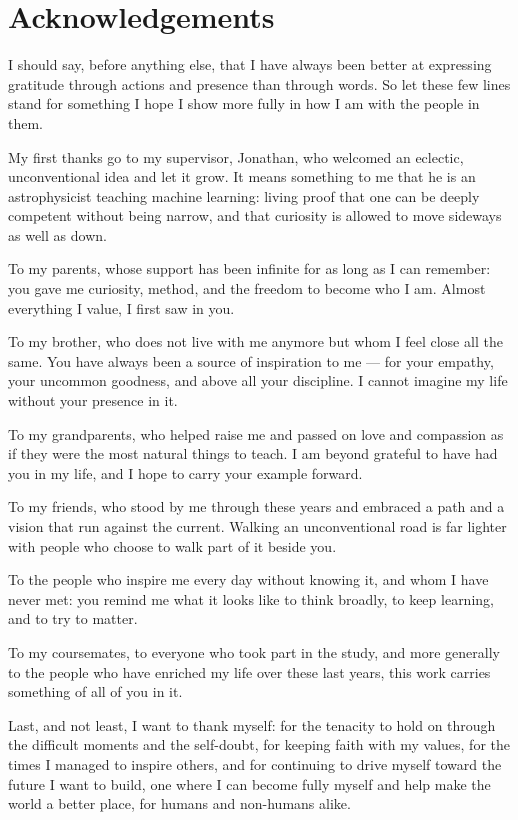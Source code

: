\chapter*{Acknowledgements}

I should say, before anything else, that I have always been better at expressing gratitude through actions and presence than through words. So let these few lines stand for something I hope I show more fully in how I am with the people in them.

My first thanks go to my supervisor, Jonathan, who welcomed an eclectic, unconventional idea and let it grow. It means something to me that he is an astrophysicist teaching machine learning: living proof that one can be deeply competent without being narrow, and that curiosity is allowed to move sideways as well as down.

To my parents, whose support has been infinite for as long as I can remember: you gave me curiosity, method, and the freedom to become who I am. Almost everything I value, I first saw in you.

To my brother, who does not live with me anymore but whom I feel close all the same. You have always been a source of inspiration to me — for your empathy, your uncommon goodness, and above all your discipline. I cannot imagine my life without your presence in it.

To my grandparents, who helped raise me and passed on love and compassion as if they were the most natural things to teach. I am beyond grateful to have had you in my life, and I hope to carry your example forward.

To my friends, who stood by me through these years and embraced a path and a vision that run against the current. Walking an unconventional road is far lighter with people who choose to walk part of it beside you.

To the people who inspire me every day without knowing it, and whom I have never met: you remind me what it looks like to think broadly, to keep learning, and to try to matter.

To my coursemates, to everyone who took part in the study, and more generally to the people who have enriched my life over these last years, this work carries something of all of you in it.

Last, and not least, I want to thank myself: for the tenacity to hold on through the difficult moments and the self-doubt, for keeping faith with my values, for the times I managed to inspire others, and for continuing to drive myself toward the future I want to build, one where I can become fully myself and help make the world a better place, for humans and non-humans alike.